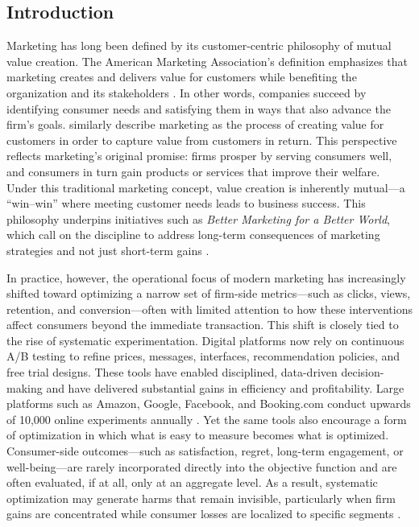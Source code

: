 \documentclass[11pt,letterpaper,english]{article}
\theoremstyle{definition}
\theoremstyle{definition}
\begin{document}
\begin{bibunit}
\newpage
\section{Introduction}
\label{sec:intro}

Marketing has long been defined by its customer-centric philosophy of mutual value creation. The American Marketing Association’s definition emphasizes that marketing creates and delivers value for customers while benefiting the organization and its stakeholders \citep{ama2017definition}. In other words, companies succeed by identifying consumer needs and satisfying them in ways that also advance the firm’s goals. \citep{armstrong2014principles} similarly describe marketing as the process of creating value for customers in order to capture value from customers in return. This perspective reflects marketing’s original promise: firms prosper by serving consumers well, and consumers in turn gain products or services that improve their welfare. Under this traditional marketing concept, value creation is inherently mutual—a “win–win” where meeting customer needs leads to business success. This philosophy underpins initiatives such as \textit{Better Marketing for a Better World}, which call on the discipline to address long-term consequences of marketing strategies and not just short-term gains \citep{chandy2021better}.

In practice, however, the operational focus of modern marketing has increasingly shifted toward optimizing a narrow set of firm-side metrics—such as clicks, views, retention, and conversion—often with limited attention to how these interventions affect consumers beyond the immediate transaction. This shift is closely tied to the rise of systematic experimentation. Digital platforms now rely on continuous A/B testing to refine prices, messages, interfaces, recommendation policies, and free trial designs. These tools have enabled disciplined, data-driven decision-making and have delivered substantial gains in efficiency and profitability. Large platforms such as Amazon, Google, Facebook, and Booking.com conduct upwards of 10,000 online experiments annually \citep{kohavi2020trustworthy}. Yet the same tools also encourage a form of optimization in which what is easy to measure becomes what is optimized. Consumer-side outcomes—such as satisfaction, regret, long-term engagement, or well-being—are rarely incorporated directly into the objective function and are often evaluated, if at all, only at an aggregate level. As a result, systematic optimization may generate harms that remain invisible, particularly when firm gains are concentrated while consumer losses are localized to specific segments \citep{bar2023algorithmic}.


\end{bibunit}
\end{document}
